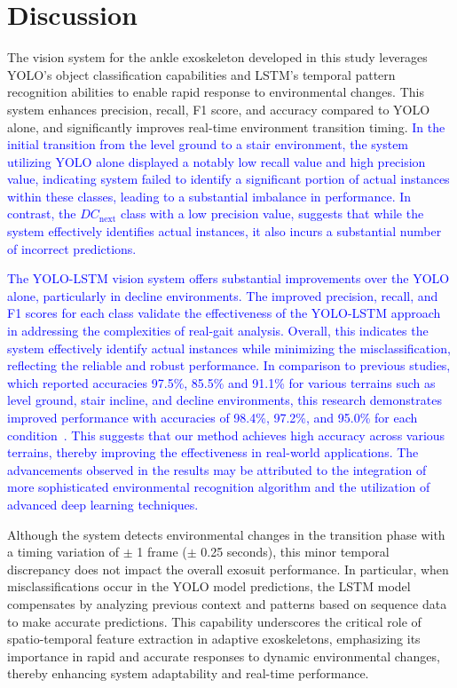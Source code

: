 \documentclass[journal,article,submit,pdftex,moreauthors]{Definitions/mdpi}
\begin{document}
\section{Discussion}

The vision system for the ankle exoskeleton developed in this study leverages YOLO's object classification capabilities and LSTM's temporal pattern recognition abilities to enable rapid response to environmental changes. This system enhances precision, recall, F1 score, and accuracy compared to YOLO alone, and significantly improves real-time environment transition timing.
\textcolor{blue}{In the initial transition from the level ground to a stair environment, the system utilizing YOLO alone displayed a notably low recall value and high precision value, indicating system failed to identify a significant portion of actual instances within these classes, leading to a substantial imbalance in performance. In contrast, the $DC_{\text{next}}$ class with a low precision value, suggests that while the system effectively identifies actual instances, it also incurs a substantial number of incorrect predictions.}

\textcolor{blue}{The YOLO-LSTM vision system offers substantial improvements over the YOLO alone, particularly in decline environments. The improved precision, recall, and F1 scores for each class validate the effectiveness of the YOLO-LSTM approach in addressing the complexities of real-gait analysis. Overall, this indicates the system effectively identify actual instances while minimizing the misclassification, reflecting the reliable and robust performance.}
\textcolor{blue}{In comparison to previous studies, which reported accuracies 97.5\%, 85.5\% and 91.1\% for various terrains such as level ground, stair incline, and decline environments, this research demonstrates improved performance with accuracies of 98.4\%, 97.2\%, and 95.0\% for each condition~\cite{Tricomi2023}. This suggests that our method achieves high accuracy across various terrains, thereby improving the effectiveness in real-world applications. The advancements observed in the results may be attributed to the integration of more sophisticated environmental recognition algorithm and the utilization of advanced deep learning techniques.}

Although the system detects environmental changes in the transition phase with a timing variation of $\pm$ 1 frame ($\pm$ 0.25 seconds), this minor temporal discrepancy does not impact the overall exosuit performance. 
In particular, when misclassifications occur in the YOLO model predictions, the LSTM model compensates by analyzing previous context and patterns based on sequence data to make accurate predictions. This capability underscores the critical role of spatio-temporal feature extraction in adaptive exoskeletons, emphasizing its importance in rapid and accurate responses to dynamic environmental changes, thereby enhancing system adaptability and real-time performance.
\end{document}
